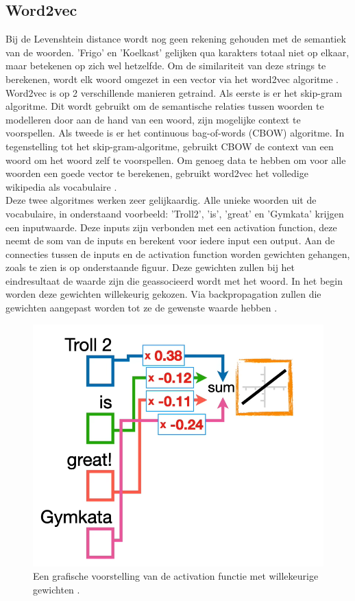 \subsection{Word2vec}
Bij de Levenshtein distance wordt nog geen rekening gehouden met de semantiek van de woorden. 'Frigo' en 'Koelkast' gelijken qua karakters totaal niet op elkaar, maar betekenen op zich wel hetzelfde. Om de similariteit van deze strings te berekenen, wordt elk woord omgezet in een vector via het word2vec algoritme \autocite{Lievens2022}.
\\\indent
Word2vec is op 2 verschillende manieren getraind. Als eerste is er het skip-gram algoritme.
Dit wordt gebruikt om de semantische relaties tussen woorden te modelleren door aan de hand van een woord, zijn mogelijke context te voorspellen. Als tweede is er het continuous bag-of-words (CBOW) algoritme. In tegenstelling tot het skip-gram-algoritme, gebruikt CBOW de context van een woord om het woord zelf te voorspellen. Om genoeg data te hebben om voor alle woorden een goede vector te berekenen, gebruikt word2vec het volledige wikipedia als vocabulaire \autocite{Starmer2023}.
\\\indent
Deze twee algoritmes werken zeer gelijkaardig. Alle unieke woorden uit de vocabulaire, in onderstaand voorbeeld: 'Troll2', 'is', 'great' en 'Gymkata' krijgen een inputwaarde. Deze inputs zijn verbonden met een activation function, deze neemt de som van de inputs en berekent voor iedere input een output. Aan de connecties tussen de inputs en de activation function worden gewichten gehangen, zoals te zien is op onderstaande figuur. Deze gewichten zullen bij het eindresultaat de waarde zijn die geassocieerd wordt met het woord. In het begin worden deze gewichten willekeurig gekozen. Via backpropagation zullen die gewichten aangepast worden tot ze de gewenste waarde hebben \autocite{Starmer2023}.
\begin{figure}[h]
    \centering
    \includegraphics[width=0.7\linewidth]{../foto's/begin}
    \caption{Een grafische voorstelling van de activation functie met willekeurige gewichten \autocite{Starmer2023}.}
    \label{fig:activation_functie_met_willekeurige_gewichten}
\end{figure}

